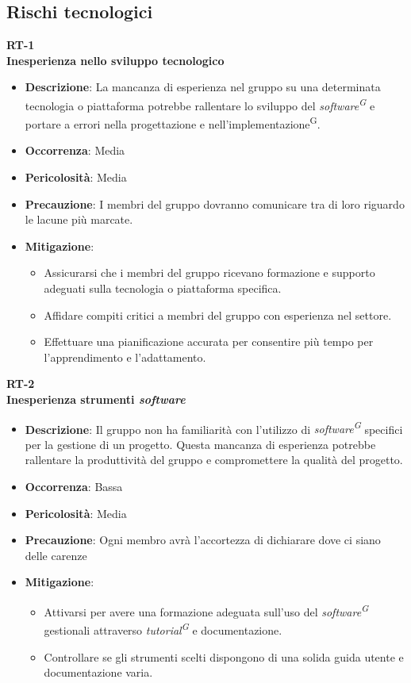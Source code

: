 \documentclass[5pt]{article}
\begin{document}
  \subsection{Rischi tecnologici}
    \textbf{RT-1} \\
    \textbf{Inesperienza nello sviluppo tecnologico}
    \begin{itemize}
      \item \textbf{Descrizione}: La mancanza di esperienza nel gruppo su una determinata tecnologia o piattaforma potrebbe rallentare lo sviluppo del \textit{software\textsuperscript{G}} e portare a errori nella progettazione e nell'implementazione\textsuperscript{G}.
      \item \textbf{Occorrenza}: Media
      \item \textbf{Pericolosità}: Media
      \item \textbf{Precauzione}: I membri del gruppo dovranno comunicare tra di loro riguardo le lacune più marcate. 
      \item \textbf{Mitigazione}: 
        \begin{itemize}
          \item Assicurarsi che i membri del gruppo ricevano formazione e supporto adeguati sulla tecnologia o piattaforma specifica.
          \item Affidare compiti critici a membri del gruppo con esperienza nel settore.
          \item Effettuare una pianificazione accurata per consentire più tempo per l'apprendimento e l'adattamento.
          \end{itemize}
    \end{itemize}
    \textbf{RT-2} \\
    \textbf{Inesperienza strumenti \textit{software}}
    \begin{itemize}
      \item \textbf{Descrizione}: Il gruppo non ha familiarità con l'utilizzo di \textit{software\textsuperscript{G}} specifici per la gestione di un progetto. Questa mancanza di esperienza potrebbe rallentare la produttività del gruppo e compromettere la qualità del progetto.
      \item \textbf{Occorrenza}: Bassa
      \item \textbf{Pericolosità}: Media
      \item \textbf{Precauzione}: Ogni membro avrà l'accortezza di dichiarare dove ci siano delle carenze
      \item \textbf{Mitigazione}: 
        \begin{itemize}
          \item  Attivarsi per avere una formazione adeguata sull'uso del \textit{software\textsuperscript{G}} gestionali attraverso \textit{tutorial\textsuperscript{G}} e documentazione.
          \item Controllare se gli strumenti scelti dispongono di una solida guida utente e documentazione varia.
        \end{itemize}
    \end{itemize}
\end{document}
